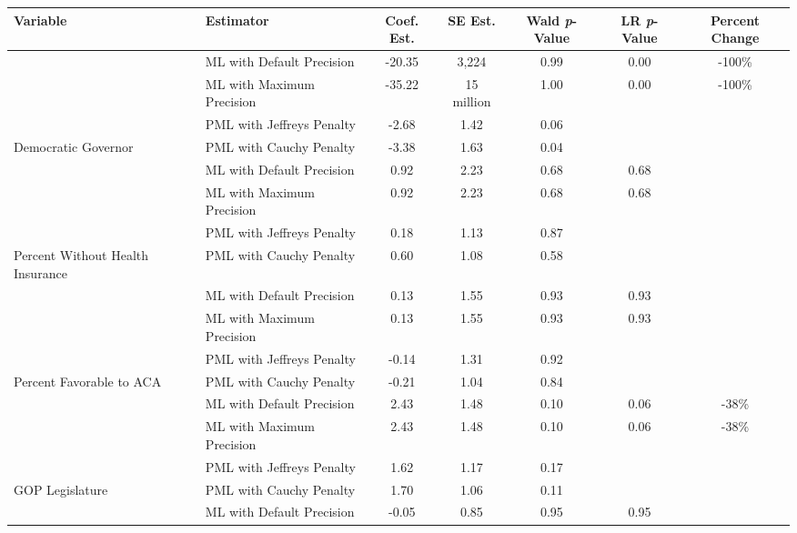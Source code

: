 
\begin{tabular}{llccccc}
\toprule
Variable & Estimator & Coef. Est. & SE Est. & Wald \textit{p}-Value & LR \textit{p}-Value & Percent Change\\
\midrule
 & ML with Default Precision & -20.35 & 3,224 & 0.99 & 0.00 & -100\%\\

 & ML with Maximum Precision & -35.22 & 15 million & 1.00 & 0.00 & -100\%\\

 & PML with Jeffreys Penalty & -2.68 & 1.42 & 0.06 &  & \\

\multirow{-4}{*}{\raggedright\arraybackslash Democratic Governor} & PML with Cauchy Penalty & -3.38 & 1.63 & 0.04 &  & \\
\cmidrule{1-7}
 & ML with Default Precision & 0.92 & 2.23 & 0.68 & 0.68 & \\

 & ML with Maximum Precision & 0.92 & 2.23 & 0.68 & 0.68 & \\

 & PML with Jeffreys Penalty & 0.18 & 1.13 & 0.87 &  & \\

\multirow{-4}{*}{\raggedright\arraybackslash Percent Without Health Insurance} & PML with Cauchy Penalty & 0.60 & 1.08 & 0.58 &  & \\
\cmidrule{1-7}
 & ML with Default Precision & 0.13 & 1.55 & 0.93 & 0.93 & \\

 & ML with Maximum Precision & 0.13 & 1.55 & 0.93 & 0.93 & \\

 & PML with Jeffreys Penalty & -0.14 & 1.31 & 0.92 &  & \\

\multirow{-4}{*}{\raggedright\arraybackslash Percent Favorable to ACA} & PML with Cauchy Penalty & -0.21 & 1.04 & 0.84 &  & \\
\cmidrule{1-7}
 & ML with Default Precision & 2.43 & 1.48 & 0.10 & 0.06 & -38\%\\

 & ML with Maximum Precision & 2.43 & 1.48 & 0.10 & 0.06 & -38\%\\

 & PML with Jeffreys Penalty & 1.62 & 1.17 & 0.17 &  & \\

\multirow{-4}{*}{\raggedright\arraybackslash GOP Legislature} & PML with Cauchy Penalty & 1.70 & 1.06 & 0.11 &  & \\
\cmidrule{1-7}
 & ML with Default Precision & -0.05 & 0.85 & 0.95 & 0.95 & \\


\end{tabular}
